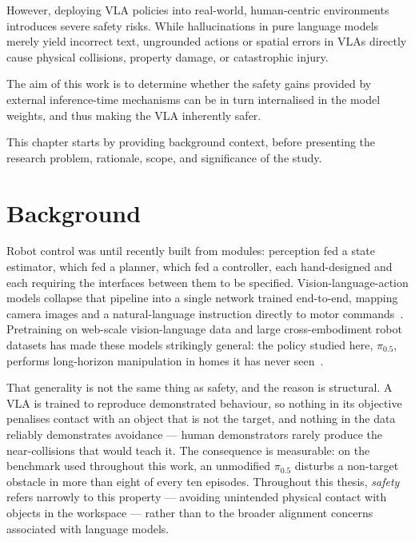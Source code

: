 \documentclass[a4paper,11pt]{report}
\begin{document}
However, deploying VLA policies into real-world, human-centric environments introduces
severe safety risks. While hallucinations in pure language models merely yield incorrect
text, ungrounded actions or spatial errors in VLAs directly cause physical collisions,
property damage, or catastrophic injury.


The aim of this work is to determine whether the safety gains provided by external inference-time mechanisms can be in turn internalised in the model weights, and thus making the VLA inherently safer. 

This chapter starts by providing background context, before presenting the research problem, rationale, scope, and significance of the study.

\section{Background}\label{sec:intro:background}

Robot control was until recently built from modules: perception fed a state estimator, which fed a
planner, which fed a controller, each hand-designed and each requiring the interfaces between them
to be specified. Vision-language-action models collapse that pipeline into a single network trained
end-to-end, mapping camera images and a natural-language instruction directly to motor
commands~\cite{black2024pi0}. Pretraining on web-scale vision-language data and large cross-embodiment
robot datasets has made these models strikingly general: the policy studied here, $\pi_{0.5}$,
performs long-horizon manipulation in homes it has never seen~\cite{physicalintelligence2025pi05}.

That generality is not the same thing as safety, and the reason is structural. A VLA is trained to
reproduce demonstrated behaviour, so nothing in its objective penalises contact with an object that
is not the target, and nothing in the data reliably demonstrates avoidance --- human demonstrators
rarely produce the near-collisions that would teach it. The consequence is measurable: on the
benchmark used throughout this work, an unmodified $\pi_{0.5}$ disturbs a non-target obstacle in
more than eight of every ten episodes. Throughout this thesis, \emph{safety} refers narrowly to this
property --- avoiding unintended physical contact with objects in the workspace --- rather than to
the broader alignment concerns associated with language models.
\end{document}
